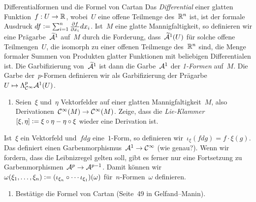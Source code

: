 \documentclass{uebblatt}
\begin{document}
\small
\begin{aufgabe}{Differentialformen und die Formel von Cartan}
Das \emph{Differential} einer glatten Funktion~$f : U \to \mathbb{R}$, wobei~$U$ eine
offene Teilmenge des~$\mathbb{R}^n$ ist, ist der formale Ausdruck
$df \vcentcolon= \sum_{i=1}^n \frac{\partial f}{\partial x_i} dx_i$.
Ist~$M$ eine glatte Mannigfaltigkeit, so definieren wir eine
Prägarbe~$\widetilde{\mathcal{A}}^1$ auf~$M$ durch die Forderung, dass~$\widetilde{\mathcal{A}}^1(U)$
für solche offene Teilmengen~$U$, die isomorph zu einer offenen Teilmenge
des~$\mathbb{R}^n$ sind, die Menge formaler Summen von Produkten glatter Funktionen
mit beliebigen Differentialen ist. Die Garbifizierung von~$\widetilde{\mathcal{A}}^1$ ist
dann die Garbe~$\mathcal{A}^1$ der \emph{1-Formen} auf~$M$. Die Garbe der~$p$-Formen
definieren wir als Garbifizierung der Prägarbe~$U \mapsto \Lambda^p_{\mathcal{C}^\infty}
\mathcal{A}^1(U)$.

\begin{enumerate}
\item Seien~$\xi$ und~$\eta$ Vektorfelder auf einer glatten
Mannigfaltigkeit~$M$, also Derivationen~$\mathcal{C}^\infty(M) \to \mathcal{C}^\infty(M)$. Zeige,
dass die \emph{Lie-Klammer}~$[\xi,\eta] \vcentcolon= \xi \circ \eta - \eta \circ \xi$
wieder eine Derivation ist.
\end{enumerate}
Ist~$\xi$ ein Vektorfeld und~$f dg$ eine~$1$-Form, so definieren
wir~$\iota_\xi(fdg) = f \cdot \xi(g)$. Das definiert einen Garbenmorphismus~$\mathcal{A}^1
\to \mathcal{C}^\infty$ (wie genau?). Wenn wir fordern, dass die Leibnizregel gelten
soll, gibt es ferner nur eine Fortsetzung zu Garbenmorphismen~$\mathcal{A}^p \to
\mathcal{A}^{p-1}$. Damit können wir~$\omega(\xi_1,\ldots,\xi_n) \vcentcolon= (\iota_{\xi_n} \circ
\cdots \iota_{\xi_1})(\omega)$ für~$n$-Formen~$\omega$ definieren.
\begin{enumerate}
\addtocounter{enumi}{1}
\item Bestätige die Formel von Cartan (Seite~49 in Gelfand--Manin).
\end{enumerate}
\end{aufgabe}
\end{document}
